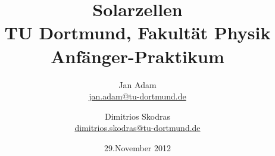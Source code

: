 

\usepackage{wrapfig}
\usepackage{caption}
\usepackage{float}



\title{Solarzellen\\				%
\large TU Dortmund, Fakultät Physik\\ 
\normalsize Anfänger-Praktikum}

\author{Jan Adam\\			%
{\small \href{jan.adam@tu-dortmund.de}{jan.adam@tu-dortmund.de}}	%
\and						%
Dimitrios Skodras\\					%
{\small \href{dimitrios.skodras@tu-dortmund.de}{dimitrios.skodras@tu-dortmund.de}}		%
}
\date{29.November 2012}				%





\maketitle					%
\thispagestyle{empty} 				%



\tableofcontents


\newpage					%


